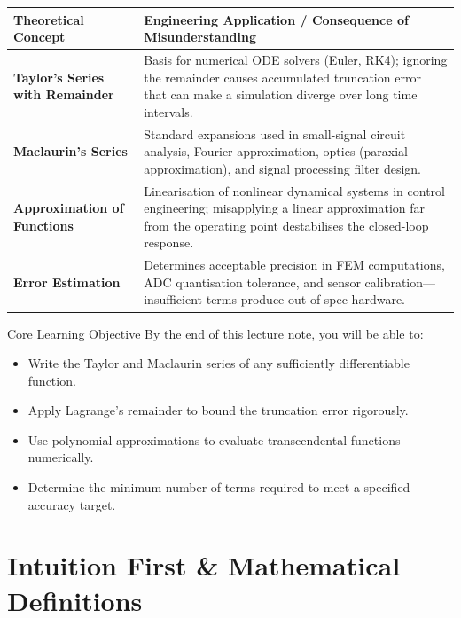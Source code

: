 \documentclass[12pt,a4paper]{article}
\begin{document}
\begin{center}
\begin{tabular}{>{\bfseries}p{5cm} p{9cm}}
\toprule
Theoretical Concept & Engineering Application / Consequence of Misunderstanding \\
\midrule
Taylor's Series with Remainder &
  Basis for numerical ODE solvers (Euler, RK4); ignoring the remainder causes
  accumulated truncation error that can make a simulation diverge over long time intervals. \\
\addlinespace
Maclaurin's Series &
  Standard expansions used in small-signal circuit analysis, Fourier approximation,
  optics (paraxial approximation), and signal processing filter design. \\
\addlinespace
Approximation of Functions &
  Linearisation of nonlinear dynamical systems in control engineering; misapplying a
  linear approximation far from the operating point destabilises the closed-loop response. \\
\addlinespace
Error Estimation &
  Determines acceptable precision in FEM computations, ADC quantisation tolerance,
  and sensor calibration---insufficient terms produce out-of-spec hardware. \\
\bottomrule
\end{tabular}
\end{center}

\begin{learnbox}{Core Learning Objective}
By the end of this lecture note, you will be able to:
\begin{itemize}[leftmargin=1.5em]
  \item Write the Taylor and Maclaurin series of any sufficiently differentiable function.
  \item Apply Lagrange's remainder to bound the truncation error rigorously.
  \item Use polynomial approximations to evaluate transcendental functions numerically.
  \item Determine the minimum number of terms required to meet a specified accuracy target.
\end{itemize}
\end{learnbox}

\section{Intuition First \& Mathematical Definitions}
\end{document}
